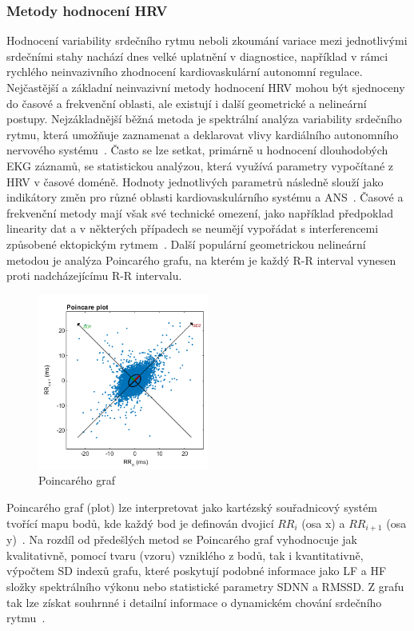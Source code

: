 \subsubsection{Metody hodnocení HRV}
\label{section:hrv_methods}
Hodnocení variability srdečního rytmu neboli zkoumání variace mezi jednotlivými
srdečními stahy nachází dnes velké uplatnění v diagnostice, například v rámci
rychlého neinvazivního zhodnocení kardiovaskulární autonomní regulace.
Nejčastější a základní neinvazivní metody hodnocení HRV mohou být sjednoceny do
časové a frekvenční oblasti, ale existují i další geometrické a nelineární
postupy. Nejzákladnější běžná metoda je spektrální analýza variability srdečního
rytmu, která umožňuje zaznamenat a deklarovat vlivy kardiálního autonomního
nervového systému~\cite{Pumprla2014}. Často se lze setkat, primárně u hodnocení
dlouhodobých EKG záznamů, se statistickou analýzou, která využívá parametry
vypočítané z HRV v časové doméně. Hodnoty jednotlivých parametrů následně slouží
jako indikátory změn pro různé oblasti kardiovaskulárního systému a
ANS~\cite{Malik1996}. Časové a frekvenční metody mají však své technické omezení, 
jako například předpoklad linearity dat a v některých případech se neumějí
vypořádat s interferencemi způsobené ektopickým rytmem~\cite{Hsu2012}. Další
populární geometrickou nelineární metodou je analýza Poincarého grafu, na kterém
je každý R-R interval vynesen proti nadcházejícímu R-R intervalu. 

\begin{figure}[h]
	\begin{center}
		\includegraphics[width=0.5\textwidth]{../assets/figures/wiki_poincare}
		\caption{Poincarého graf~\cite{wikiPoincare}}
		\label{fig:wiki_poincare}
	\end{center}
\end{figure}

Poincarého graf (plot) lze interpretovat jako kartézský souřadnicový systém
tvořící mapu bodů, kde každý bod je definován dvojicí $RR_i$ (osa x) a
$RR_{i+1}$ (osa y)~\cite{Hsu2012,Hejjel2001}. Na rozdíl od předešlých metod se
Poincarého graf vyhodnocuje jak kvalitativně, pomocí tvaru (vzoru) vzniklého z
bodů, tak i kvantitativně, výpočtem SD indexů grafu, které poskytují podobné
informace jako LF a HF složky spektrálního výkonu nebo statistické parametry
SDNN a RMSSD. Z grafu tak lze získat souhrnné i detailní informace o dynamickém
chování srdečního rytmu~\cite{Hsu2012,Kubickova2016}. 


